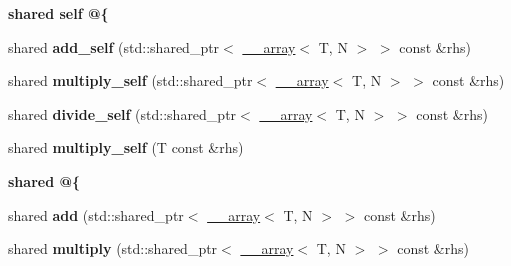 \begin{Indent}{\bf shared self @\{}\par
\begin{DoxyCompactItemize}
\item 
\hypertarget{class____array_ab98796270b9e65a78d5d9eda70c66ef9}{shared {\bfseries add\-\_\-self} (std\-::shared\-\_\-ptr$<$ \hyperlink{class____array}{\-\_\-\-\_\-array}$<$ T, N $>$ $>$ const \&rhs)}\label{class____array_ab98796270b9e65a78d5d9eda70c66ef9}

\item 
\hypertarget{class____array_a34920f8760f31932fa0b7134ad852fe3}{shared {\bfseries multiply\-\_\-self} (std\-::shared\-\_\-ptr$<$ \hyperlink{class____array}{\-\_\-\-\_\-array}$<$ T, N $>$ $>$ const \&rhs)}\label{class____array_a34920f8760f31932fa0b7134ad852fe3}

\item 
\hypertarget{class____array_a99892174a079f472bcd3f95621e5b18e}{shared {\bfseries divide\-\_\-self} (std\-::shared\-\_\-ptr$<$ \hyperlink{class____array}{\-\_\-\-\_\-array}$<$ T, N $>$ $>$ const \&rhs)}\label{class____array_a99892174a079f472bcd3f95621e5b18e}

\item 
\hypertarget{class____array_a87ee1d56dc650d1cc15fc4a17e29a2ff}{shared {\bfseries multiply\-\_\-self} (T const \&rhs)}\label{class____array_a87ee1d56dc650d1cc15fc4a17e29a2ff}

\end{DoxyCompactItemize}
\end{Indent}
\begin{Indent}{\bf shared @\{}\par
\begin{DoxyCompactItemize}
\item 
\hypertarget{class____array_ab20b7f53c81ac31b349d31bc58e650f6}{shared {\bfseries add} (std\-::shared\-\_\-ptr$<$ \hyperlink{class____array}{\-\_\-\-\_\-array}$<$ T, N $>$ $>$ const \&rhs)}\label{class____array_ab20b7f53c81ac31b349d31bc58e650f6}

\item 
\hypertarget{class____array_a35d7cfec43ce9f395f148b64a6083a69}{shared {\bfseries multiply} (std\-::shared\-\_\-ptr$<$ \hyperlink{class____array}{\-\_\-\-\_\-array}$<$ T, N $>$ $>$ const \&rhs)}\label{class____array_a35d7cfec43ce9f395f148b64a6083a69}

\end{DoxyCompactItemize}
\end{Indent}
